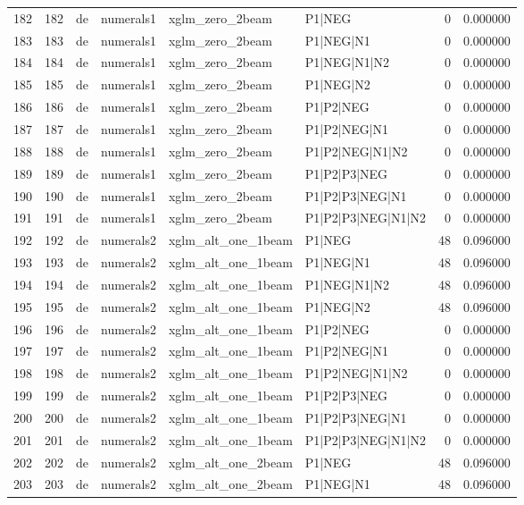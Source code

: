 \begin{tabular}{lrllllrr}
182 & 182 & de & numerals1 & xglm_zero_2beam & P1|NEG & 0 & 0.000000 \\
183 & 183 & de & numerals1 & xglm_zero_2beam & P1|NEG|N1 & 0 & 0.000000 \\
184 & 184 & de & numerals1 & xglm_zero_2beam & P1|NEG|N1|N2 & 0 & 0.000000 \\
185 & 185 & de & numerals1 & xglm_zero_2beam & P1|NEG|N2 & 0 & 0.000000 \\
186 & 186 & de & numerals1 & xglm_zero_2beam & P1|P2|NEG & 0 & 0.000000 \\
187 & 187 & de & numerals1 & xglm_zero_2beam & P1|P2|NEG|N1 & 0 & 0.000000 \\
188 & 188 & de & numerals1 & xglm_zero_2beam & P1|P2|NEG|N1|N2 & 0 & 0.000000 \\
189 & 189 & de & numerals1 & xglm_zero_2beam & P1|P2|P3|NEG & 0 & 0.000000 \\
190 & 190 & de & numerals1 & xglm_zero_2beam & P1|P2|P3|NEG|N1 & 0 & 0.000000 \\
191 & 191 & de & numerals1 & xglm_zero_2beam & P1|P2|P3|NEG|N1|N2 & 0 & 0.000000 \\
192 & 192 & de & numerals2 & xglm_alt_one_1beam & P1|NEG & 48 & 0.096000 \\
193 & 193 & de & numerals2 & xglm_alt_one_1beam & P1|NEG|N1 & 48 & 0.096000 \\
194 & 194 & de & numerals2 & xglm_alt_one_1beam & P1|NEG|N1|N2 & 48 & 0.096000 \\
195 & 195 & de & numerals2 & xglm_alt_one_1beam & P1|NEG|N2 & 48 & 0.096000 \\
196 & 196 & de & numerals2 & xglm_alt_one_1beam & P1|P2|NEG & 0 & 0.000000 \\
197 & 197 & de & numerals2 & xglm_alt_one_1beam & P1|P2|NEG|N1 & 0 & 0.000000 \\
198 & 198 & de & numerals2 & xglm_alt_one_1beam & P1|P2|NEG|N1|N2 & 0 & 0.000000 \\
199 & 199 & de & numerals2 & xglm_alt_one_1beam & P1|P2|P3|NEG & 0 & 0.000000 \\
200 & 200 & de & numerals2 & xglm_alt_one_1beam & P1|P2|P3|NEG|N1 & 0 & 0.000000 \\
201 & 201 & de & numerals2 & xglm_alt_one_1beam & P1|P2|P3|NEG|N1|N2 & 0 & 0.000000 \\
202 & 202 & de & numerals2 & xglm_alt_one_2beam & P1|NEG & 48 & 0.096000 \\
203 & 203 & de & numerals2 & xglm_alt_one_2beam & P1|NEG|N1 & 48 & 0.096000 \\

\end{tabular}
